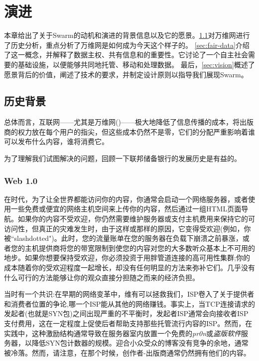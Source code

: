 \chapter{演进\statusgreen}\label{chap:vision}



本章给出了关于Swarm的动机和演进的背景信息以及它的愿景。\ref{sec:historical_context}对万维网进行了历史分析，重点分析了万维网是如何成为今天这个样子的。
\ref{sec:fair-data}介绍了这一概念，并解释了数据主权、共有信息和的重要性。它讨论了一个自主社会需要的基础设施，以便能够共同地托管、移动和处理数据。
最后，\ref{sec:vision}概述了愿景背后的价值，阐述了技术的要求，并制定设计原则以指导我们展现Swarm。

\section{历史背景\statusgreen}\label{sec:historical_context}
\green{}
总体而言，互联网——尤其是万维网()——极大地降低了信息传播的成本，将出版商的权力放在每个用户的指尖，但这些成本仍然不是零，它们的分配严重影响着谁可以发布什么内容，谁将消费它。

为了理解我们试图解决的问题，回顾一下联邦储备银行的发展历史是有益的。

\subsection{Web 1.0 \statusgreen}\label{sec:web_1}

在时代，为了让全世界都能访问你的内容，你通常会启动一个网络服务器，或者使用一些免费或便宜的网络主机空间来上传你的内容，然后通过一组HTML页面导航。如果你的内容不受欢迎，你仍然需要维护服务器或支付主机费用来保持它的可访问性，但真正的灾难发生时，由于这样或那样的原因，它变得受欢迎(例如，你被“slashdotted")。此时，您的流量账单在您的服务器在负载下崩溃之前暴涨，或者您的主机提供商将您的带宽限制到使您的内容对您的大多数听众基本上不可用的地步。如果你想要保持受欢迎，你必须投资于用胖管道连接的高可用性集群;你的成本随着你的受欢迎程度一起增长，却没有任何明显的方法来弥补它们。几乎没有什么可行的方法能够让你的观众直接分担随之而来的经济负担。

当时有一个共识:在早期的网络变革中，维有可以拯救我们，ISP卷入了关于提供者和消费者位置的争论,哪一个ISP能从其他的网络赚钱。事实上，当TCP连接请求的发起者(也就是SYN包)之间出现严重的不平衡时，发起者ISP通常会向接收者ISP支付费用，这在一定程度上促使后者帮助支持那些托管流行内容的ISP。然而，在实践中，这种激励结构通常导致在服务器室内放置一个免费的\emph{pr0n}或\emph{盗版软件}服务器，以降低SYN包计数器的规模。迎合小众受众的博客没有竞争的余地，通常被冷落。然而，请注意，在那个时候，创作者-出版商通常仍然拥有他们的内容。

